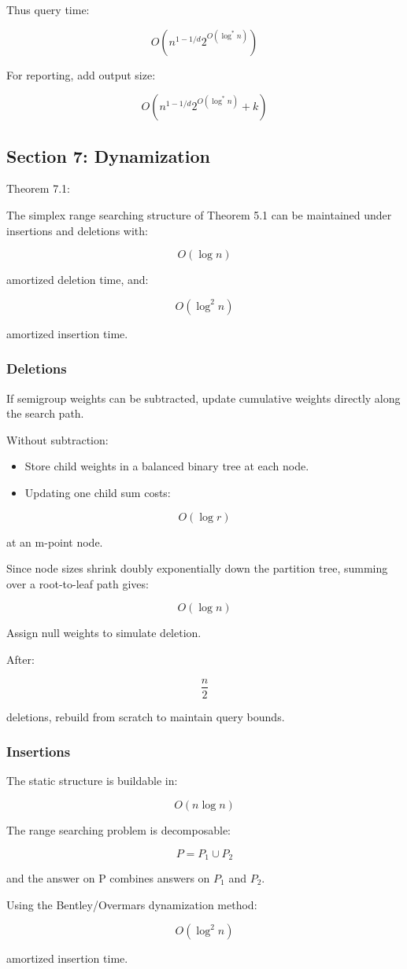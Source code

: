 \documentclass[
  11pt,
]{article}
\providecommand{\tightlist}{%
  \setlength{\itemsep}{0pt}\setlength{\parskip}{0pt}}
\begin{document}
Thus query time:

\[
O(n^{1-1/d}2^{O(\log^\ast  n)})
\]

For reporting, add output size:

\[
O(n^{1-1/d}2^{O(\log^\ast  n)}+k)
\]

\hypertarget{section-7-dynamization}{%
\subsection{Section 7: Dynamization}\label{section-7-dynamization}}

Theorem 7.1:

The simplex range searching structure of Theorem 5.1 can be maintained
under insertions and deletions with:

\[
O(\log n)
\]

amortized deletion time, and:

\[
O(\log^2 n)
\]

amortized insertion time.

\hypertarget{deletions}{%
\subsubsection{Deletions}\label{deletions}}

If semigroup weights can be subtracted, update cumulative weights
directly along the search path.

Without subtraction:

\begin{itemize}
\tightlist
\item
  Store child weights in a balanced binary tree at each node.
\item
  Updating one child sum costs:
\end{itemize}

\[
O(\log r)
\]

at an m-point node.

Since node sizes shrink doubly exponentially down the partition tree,
summing over a root-to-leaf path gives:

\[
O(\log n)
\]

Assign null weights to simulate deletion.

After:

\[
\frac{n}{2}
\]

deletions, rebuild from scratch to maintain query bounds.

\hypertarget{insertions}{%
\subsubsection{Insertions}\label{insertions}}

The static structure is buildable in:

\[
O(n\log n)
\]

The range searching problem is decomposable:

\[
P=P_1\cup P_2
\]

and the answer on P combines answers on \(P_1\) and \(P_2\).

Using the Bentley/Overmars dynamization method:

\[
O(\log^2 n)
\]

amortized insertion time.
\end{document}

